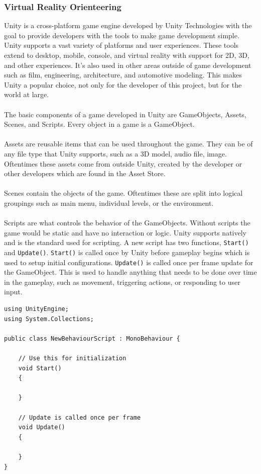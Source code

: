 \subsubsection{Virtual Reality Orienteering}
Unity is a cross-platform game engine developed by Unity Technologies with the goal to provide developers with the tools to make game development simple. Unity supports a vast variety of platforms and user experiences. These tools extend to desktop, mobile, console, and virtual reality with support for 2D, 3D, and other experiences. It's also used in other areas outside of game development such as film, engineering, architecture, and automotive modeling. This makes Unity a popular choice, not only for the developer of this project, but for the world at large.  \\
\\
The basic components of a game developed in Unity are GameObjects, Assets, Scenes, and Scripts. Every object in a game is a GameObject.\\
\\
Assets are reusable items that can be used throughout the game. They can be of any file type that Unity supports, such as a 3D model, audio file, image. Oftentimes these assets come from outside Unity, created by the developer or other developers which are found in the Asset Store. \\
\\
Scenes contain the objects of the game. Oftentimes these are split into logical groupings such as main menu, individual levels, or the environment. \\
\\
Scripts are what controls the behavior of the GameObjects. Without scripts the game would be static and have no interaction or logic. Unity supports \C natively and is the standard used for scripting. A new script has two functions, \lstinline{Start()} and \lstinline{Update()}. \lstinline{Start()} is called once by Unity before gameplay begins which is used to setup initial configurations. \lstinline{Update()} is called once per frame update for the GameObject. This is used to handle anything that needs to be done over time in the gameplay, such as movement, triggering actions, or responding to user input.  

\begin{lstlisting}[caption=New Script in Unity]
using UnityEngine;
using System.Collections;

public class NewBehaviourScript : MonoBehaviour {

	// Use this for initialization
	void Start()
	{
	
	}
	
	// Update is called once per frame
	void Update() 
	{
	
	}
}
\end{lstlisting}

